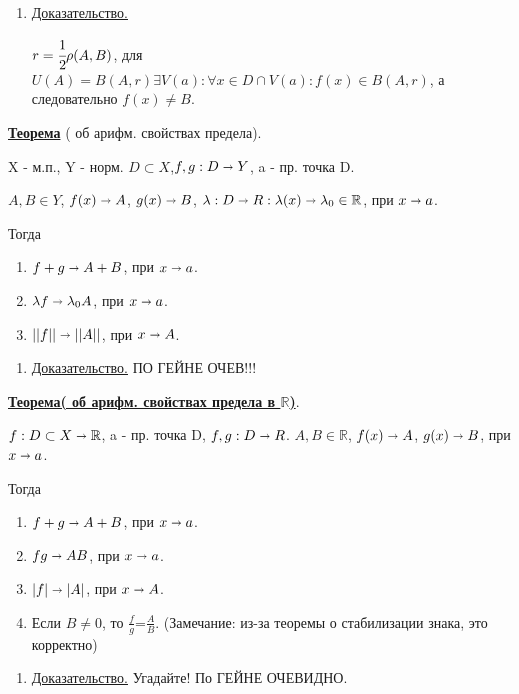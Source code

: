 \documentclass{article}
\newcommand{\thmm}[1]{\underline{\textbf{#1}}}
\begin{document}
\begin{enumerate}
        \item[] \uline{Доказательство.}

        $r= \cfrac{1}{2} \rho(A,B)$, для $U(A) = B(A,r) \exists V(a): \forall x \in D \cap V(a): f(x) \in B(A,r)$,  а следовательно $f(x) \neq B$.
\end{enumerate}

\thmm{Теорема} ( об арифм. свойствах предела).

X - м.п., Y - норм. $D \subset X$,$ f,g: D \shortrightarrow Y$, a - пр. точка D.

$A,B \in Y$, $f(x) \shortrightarrow A$, $g(x) \shortrightarrow B$, $ \lambda: D \shortrightarrow R: \lambda(x) \shortrightarrow \lambda_0 \in \mathbb{R}$, при $x \shortrightarrow a$.

Тогда  
\begin{enumerate}
    \item $f + g \shortrightarrow A + B$, при $x\shortrightarrow a$.
    \item $\lambda f \shortrightarrow \lambda_0 A$, при $x\shortrightarrow a$.
    \item $||f||\shortrightarrow ||A||$, при $x\shortrightarrow A$.
\end{enumerate}
\begin{enumerate}
        \item[] \uline{Доказательство.}
            ПО ГЕЙНЕ ОЧЕВ!!!
\end{enumerate}
\thmm{Теорема( об арифм. свойствах предела в $\mathbb{R}$)}.

$f: D\subset X \shortrightarrow \mathbb{R}$, a - пр. точка D, $f,g: D\shortrightarrow R$. $A,B \in \mathbb{R}$, $f(x) \shortrightarrow A$, $g(x) \shortrightarrow B$, при $x\shortrightarrow a$.

Тогда  
\begin{enumerate}
    \item $f + g \shortrightarrow A + B$, при $x\shortrightarrow a$.
    \item $f g \shortrightarrow AB$, при $x\shortrightarrow a$.
    \item $|f|\shortrightarrow |A|$, при $x\shortrightarrow A$.
    \item Если $B \neq 0$, то $\frac{f}{g}$=$\frac{A}{B}$. (Замечание: из-за теоремы о стабилизации знака, это корректно)
\end{enumerate}
\begin{enumerate}
        \item[] \uline{Доказательство.}
            Угадайте! По ГЕЙНЕ ОЧЕВИДНО.
\end{enumerate}
\end{document}

